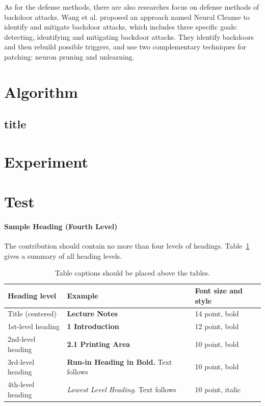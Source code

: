 \documentclass[runningheads]{llncs}
\begin{document}
As for the defense methods, there are also researches focus on defense methods of backdoor attacks. Wang et al. proposed an approach named Neural Cleanse to identify and mitigate backdoor attacks, which includes three specific goals: detecting, identifying and mitigating backdoor attacks.\cite{h7} They identify backdoors and then rebuild possible triggers, and use two complementary techniques for patching: neuron pruning and unlearning. 

\section{Algorithm}

\subsection{title}

\section{Experiment}





\section{Test}
\paragraph{Sample Heading (Fourth Level)}
The contribution should contain no more than four levels of
headings. Table~\ref{tab1} gives a summary of all heading levels.

\begin{table}
\caption{Table captions should be placed above the
tables.}\label{tab1}
\begin{tabular}{|l|l|l|}
\hline
Heading level &  Example & Font size and style\\
\hline
Title (centered) &  {\Large\bfseries Lecture Notes} & 14 point, bold\\
1st-level heading &  {\large\bfseries 1 Introduction} & 12 point, bold\\
2nd-level heading & {\bfseries 2.1 Printing Area} & 10 point, bold\\
3rd-level heading & {\bfseries Run-in Heading in Bold.} Text follows & 10 point, bold\\
4th-level heading & {\itshape Lowest Level Heading.} Text follows & 10 point, italic\\
\hline
\end{tabular}
\end{table}
\end{document}

